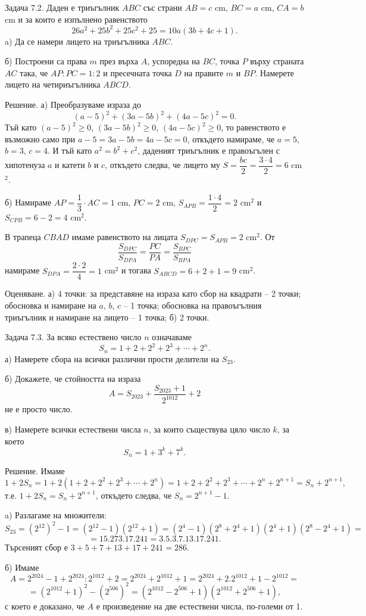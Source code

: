 Задача 7.2. Даден е триъгълник $ABC$ със страни $AB=c$ cm, $BC=a$ cm, $CA=b$ cm и за които е изпълнено равенството
$$
26a^2+25b^2+25c^2+25=10a(3b+4c+1).
$$
a) Да се намери лицето на триъгълника $ABC$.

б) Построени са права $m$ през върха $A$, успоредна на $BC$, точка $P$ върху страната $AC$ така, че $AP:PC=1:2$ и пресечната точка $D$ на правите $m$ и $BP$. Намерете лицето на четириъгълника $ABCD$.

Решение. а) Преобразуваме израза до
$$
(a-5)^2+(3a-5b)^2+(4a-5c)^2=0.
$$
Тъй като $(a-5)^2\ge0$, $(3a-5b)^2\ge0$, $(4a-5c)^2\ge0$, то равенството е възможно само при $a-5=3a-5b=4a-5c=0$, откъдето намираме, че $a=5$, $b=3$, $c=4$. И тъй като $a^2=b^2+c^2$, даденият триъгълник е правоъгълен с хипотенуза $a$ и катети $b$ и $c$, откъдето следва, че лицето му $S=\dfrac{bc}{2}=\dfrac{3\cdot4}{2}=6$ cm$^2$.

б) Намираме $AP=\dfrac13\cdot AC=1$ cm, $PC=2$ cm, $S_{APB}=\dfrac{1\cdot4}{2}=2$ cm$^2$ и $S_{CPB}=6-2=4$ cm$^2$.

В трапеца $CBAD$ имаме равенството на лицата $S_{DPC}=S_{APB}=2$ cm$^2$. От
$$
\frac{S_{DPC}}{S_{DPA}}=\frac{PC}{PA}=\frac{S_{BPC}}{S_{BPA}}
$$
намираме $S_{DPA}=\dfrac{2\cdot2}{4}=1$ cm$^2$ и тогава $S_{ABCD}=6+2+1=9$ cm$^2$.

Оценяване. а) 4 точки: за представяне на израза като сбор на квадрати – 2 точки; обосновка и намиране на $a$, $b$, $c$ – 1 точка; обосновка на правоъгълния триъгълник и намиране на лицето – 1 точка; б) 2 точки.

Задача 7.3. За всяко естествено число $n$ означаваме
$$
S_n=1+2+2^2+2^3+\cdots+2^n.
$$
а) Намерете сбора на всички различни прости делители на $S_{23}$.

б) Докажете, че стойността на израза
$$
A=S_{2023}+\frac{S_{2023}+1}{2^{1012}}+2
$$
не е просто число.

в) Намерете всички естествени числа $n$, за които съществува цяло число $k$, за което
$$
S_n=1+3^k+7^k.
$$

Решение. Имаме
$$
1+2S_n=1+2(1+2+2^2+2^3+\cdots+2^n)=1+2+2^2+2^3+\cdots+2^n+2^{n+1}=S_n+2^{n+1},
$$
т.е. $1+2S_n=S_n+2^{n+1}$, откъдето следва, че $S_n=2^{n+1}-1$.

a) Разлагаме на множители:
$$
S_{23}=(2^{12})^2-1=(2^{12}-1)(2^{12}+1)=(2^4-1)(2^8+2^4+1)(2^4+1)(2^8-2^4+1)=
$$
$$
=15.273.17.241=3.5.3.7.13.17.241.
$$
Търсеният сбор е $3+5+7+13+17+241=286$.

б) Имаме
$$
A=2^{2024}-1+2^{2024}:2^{1012}+2=2^{2024}+2^{1012}+1=2^{2024}+2.2^{1012}+1-2^{1012}=
$$
$$
=(2^{1012}+1)^2-(2^{506})^2=(2^{1012}-2^{506}+1)(2^{1012}+2^{506}+1),
$$
с което е доказано, че $A$ е произведение на две естествени числа, по-големи от 1.

